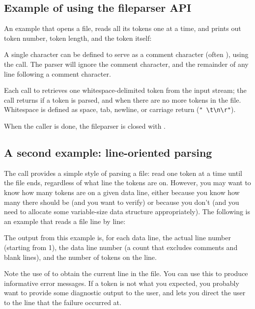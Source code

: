 \subsection{Example of using the fileparser API}

An example that opens a file, reads all its tokens one at a time, and
prints out token number, token length, and the token itself:



A single character can be defined to serve as a comment character
(often \ccode{\#}), using the 
call. The parser will ignore the comment character, and the remainder
of any line following a comment character.

Each call to  retrieves one
whitespace-delimited token from the input stream; the call returns
 if a token is parsed, and  when there are
no more tokens in the file. Whitespace is defined as space, tab,
newline, or carriage return (\verb+" \t\n\r"+).

When the caller is done, the fileparser is closed with
.

\subsection{A second example: line-oriented parsing}

The  call provides a simple style
of parsing a file: read one token at a time until the file ends,
regardless of what line the tokens are on. However, you may want to
know how many tokens are on a given data line, either because you know
how many there should be (and you want to verify) or because you don't
(and you need to allocate some variable-size data structure
appropriately). The following is an example that reads a file line by
line:



The output from this example is, for each data line, the actual line
number (starting from 1), the data line number (a count that excludes
comments and blank lines), and the number of tokens on the line.

Note the use of  to obtain the current line in
the file. You can use this to produce informative error messages.  If
a token is not what you expected, you probably want to provide some
diagnostic output to the user, and  lets you
direct the user to the line that the failure occurred at.







